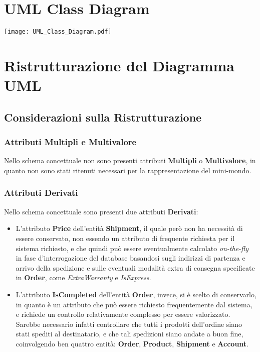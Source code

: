 
\section{UML Class Diagram}
\begin{center}
  \texttt{[image: UML\_Class\_Diagram.pdf]}
\end{center}

\newpage

\section{Ristrutturazione del Diagramma UML}

\subsection{Considerazioni sulla Ristrutturazione}

\subsubsection{Attributi Multipli e Multivalore}

Nello schema concettuale non sono presenti attributi \textbf{Multipli} o \textbf{Multivalore}, in quanto non sono stati ritenuti necessari per la rappresentazione del mini-mondo.

\subsubsection{Attributi Derivati}

Nello schema concettuale sono presenti due attributi \textbf{Derivati}:

\begin{itemize}
  \item L'attributo \textbf{Price} dell'entità \textbf{Shipment}, il quale però non ha necessità di essere conservato, non essendo un attributo di frequente richiesta per il sistema richiesto, e che quindi può essere eventualmente calcolato \textit{on-the-fly} in fase d'interrogazione del database basandosi sugli indirizzi di partenza e arrivo della spedizione e sulle eventuali modalità extra di consegna specificate in \textbf{Order}, come \textit{ExtraWarranty} e \textit{IsExpress}.
  \item L'attributo \textbf{IsCompleted} dell'entità \textbf{Order}, invece, si è scelto di conservarlo, in quanto è un attributo che può essere richiesto frequentemente dal sistema, e richiede un controllo relativamente complesso per essere valorizzato. Sarebbe necessario infatti controllare che tutti i prodotti dell'ordine siano stati spediti al destinatario, e che tali spedizioni siano andate a buon fine, coinvolgendo ben quattro entità: \textbf{Order}, \textbf{Product}, \textbf{Shipment} e \textbf{Account}. %
\end{itemize}

